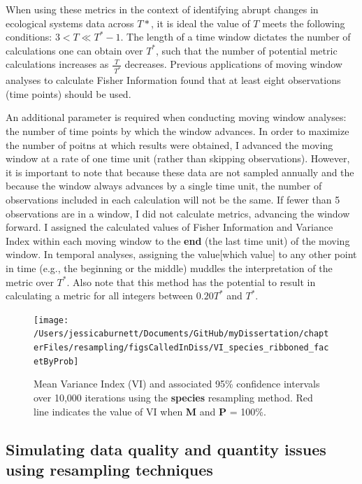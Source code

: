 \documentclass[12pt,twoside,openany]{reedthesis}
\begin{document}
When using these metrics in the context of identifying abrupt changes in ecological systems data across \(T*\), it is ideal the value of \(T\) meets the following conditions: \(3 < T \ll T^*-1\). The length of a time window dictates the number of calculations one can obtain over \(T^*\), such that the number of potential metric calculations increases as \(\frac{T}{\ T^*}\) decreases. Previous applications of moving window analyses to calculate Fisher Information found that at least eight observations (time points) should be used.

An additional parameter is required when conducting moving window analyses: the number of time points by which the window advances. In order to maximize the number of poitns at which results were obtained, I advanced the moving window at a rate of one time unit (rather than skipping observations). However, it is important to note that because these data are not sampled annually and the because the window always advances by a single time unit, the number of observations included in each calculation will not be the same. If fewer than 5 observations are in a window, I did not calculate metrics, advancing the window forward. I assigned the calculated values of Fisher Information and Variance Index within each moving window to the \textbf{end} (the last time unit) of the moving window. In temporal analyses, assigning the value{[}which value{]} to any other point in time (e.g., the beginning or the middle) muddles the interpretation of the metric over \(T^*\). Also note that this method has the potential to result in calculating a metric for all integers between \(0.20 T^*\) and \(T^*\).

\begin{figure}
\texttt{[image: /Users/jessicaburnett/Documents/GitHub/myDissertation/chapterFiles/resampling/figsCalledInDiss/VI\_species\_ribboned\_facetByProb]} \caption{Mean Variance Index (VI) and associated 95\% confidence intervals over 10,000 iterations using the \textbf{species} resampling method. Red line indicates the value of VI when \textbf{M} and \textbf{P} = 100\%.}\label{fig:viResamp2}
\end{figure}
\hypertarget{simulating-data-quality-and-quantity-issues-using-resampling-techniques}{%
\subsection{Simulating data quality and quantity issues using resampling techniques}\label{simulating-data-quality-and-quantity-issues-using-resampling-techniques}}
\end{document}
